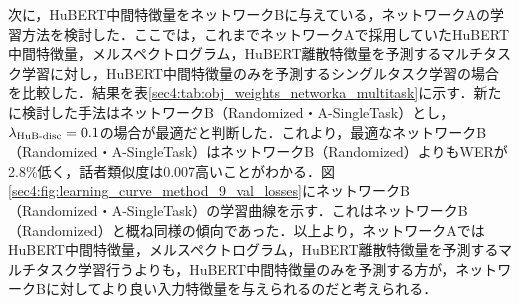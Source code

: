 次に，HuBERT中間特徴量をネットワークBに与えている，ネットワークAの学習方法を検討した．ここでは，これまでネットワークAで採用していたHuBERT中間特徴量，メルスペクトログラム，HuBERT離散特徴量を予測するマルチタスク学習に対し，HuBERT中間特徴量のみを予測するシングルタスク学習の場合を比較した．結果を表\ref{sec4:tab:obj_weights_networka_multitask}に示す．新たに検討した手法はネットワークB（Randomized・A-SingleTask）とし，$\lambda_{\text{HuB-disc}} = 0.1$の場合が最適だと判断した．これより，最適なネットワークB（Randomized・A-SingleTask）はネットワークB（Randomized）よりもWERが2.8\%低く，話者類似度は0.007高いことがわかる．図\ref{sec4:fig:learning_curve_method_9_val_losses}にネットワークB（Randomized・A-SingleTask）の学習曲線を示す．これはネットワークB（Randomized）と概ね同様の傾向であった．以上より，ネットワークAではHuBERT中間特徴量，メルスペクトログラム，HuBERT離散特徴量を予測するマルチタスク学習行うよりも，HuBERT中間特徴量のみを予測する方が，ネットワークBに対してより良い入力特徴量を与えられるのだと考えられる．

\begin{table}[bt]
    \centering
    \caption{ネットワークAにおけるマルチタスク学習の有無による比較}
    \label{sec4:tab:obj_weights_networka_multitask}
    \begin{center}
        \renewcommand{\arraystretch}{1.0} %
        \setlength{\tabcolsep}{8pt}      %
    \end{center}
\end{table}

